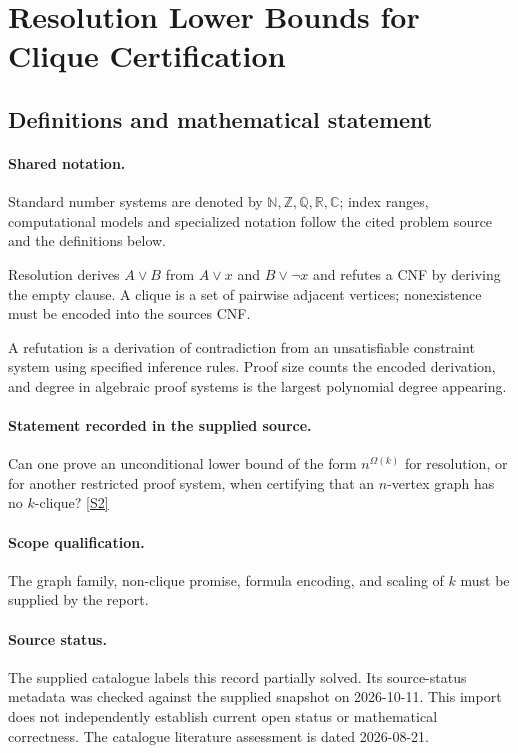 \documentclass[11pt]{article}
\newcommand{\sref}[2]{\hyperlink{source:#1:#2}{[S#2]}}
\begin{document}
\section{Resolution Lower Bounds for Clique Certification}\label{statement}

\subsection{Definitions and mathematical statement}

\paragraph{Shared notation.}Standard number systems are denoted by $\mathbb N,\mathbb Z,\mathbb Q,\mathbb R,\mathbb C$; index ranges, computational models and specialized notation follow the cited problem source and the definitions below.


Resolution derives $A\lor B$ from $A\lor x$ and $B\lor\neg x$ and refutes a CNF by deriving the empty clause. A clique is a set of pairwise adjacent vertices; nonexistence must be encoded into the source\textquotesingle s CNF.

A refutation is a derivation of contradiction from an unsatisfiable constraint system using specified inference rules. Proof size counts the encoded derivation, and degree in algebraic proof systems is the largest polynomial degree appearing.
\paragraph{Statement recorded in the supplied source.}
Can one prove an unconditional lower bound of the form $n^{\Omega(k)}$ for resolution, or for another restricted proof system, when certifying that an $n$-vertex graph has no $k$-clique? \sref{statement}{2}
\paragraph{Scope qualification.}
The graph family, non-clique promise, formula encoding, and scaling of $k$ must be supplied by the report.
\paragraph{Source status.}
The supplied catalogue labels this record partially solved. Its source-status metadata was checked against the supplied snapshot on 2026-10-11. This import does not independently establish current open status or mathematical correctness. The catalogue literature assessment is dated 2026-08-21.
\end{document}
